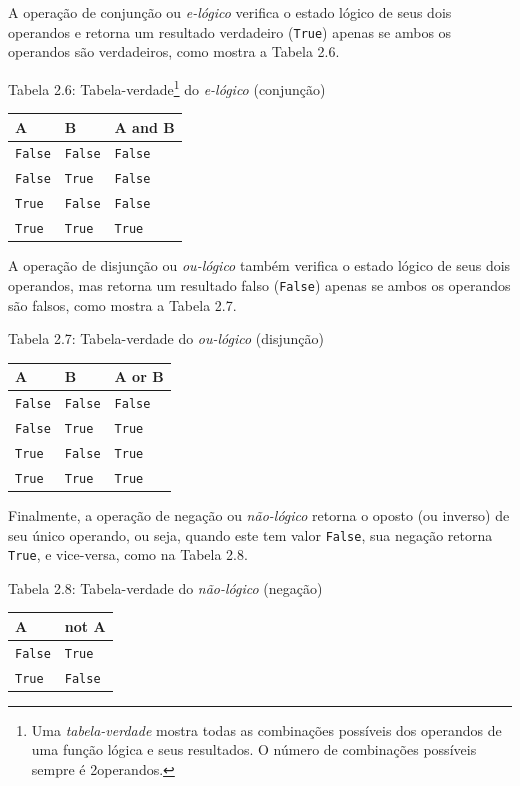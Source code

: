 \documentclass[
]{book}
\begin{document}
A operação de conjunção ou \emph{e-lógico} verifica o estado lógico de seus dois operandos e retorna um resultado verdadeiro (\texttt{True}) apenas se ambos os operandos são verdadeiros, como mostra a Tabela 2.6.

Tabela 2.6: Tabela-verdade\footnote{Uma \emph{tabela-verdade} mostra todas as combinações possíveis dos operandos de uma função lógica e seus resultados. O número de combinações possíveis sempre é 2operandos.} do \emph{e-lógico} (conjunção)

\begin{longtable}[]{@{}lll@{}}
\toprule
A & B & A and B \\
\midrule
\endhead
\texttt{False} & \texttt{False} & \texttt{False} \\
\texttt{False} & \texttt{True} & \texttt{False} \\
\texttt{True} & \texttt{False} & \texttt{False} \\
\texttt{True} & \texttt{True} & \texttt{True} \\
\bottomrule
\end{longtable}

A operação de disjunção ou \emph{ou-lógico} também verifica o estado lógico de seus dois operandos, mas retorna um resultado falso (\texttt{False}) apenas se ambos os operandos são falsos, como mostra a Tabela 2.7.

Tabela 2.7: Tabela-verdade do \emph{ou-lógico} (disjunção)

\begin{longtable}[]{@{}lll@{}}
\toprule
A & B & A or B \\
\midrule
\endhead
\texttt{False} & \texttt{False} & \texttt{False} \\
\texttt{False} & \texttt{True} & \texttt{True} \\
\texttt{True} & \texttt{False} & \texttt{True} \\
\texttt{True} & \texttt{True} & \texttt{True} \\
\bottomrule
\end{longtable}

Finalmente, a operação de negação ou \emph{não-lógico} retorna o oposto (ou inverso) de seu único operando, ou seja, quando este tem valor \texttt{False}, sua negação retorna \texttt{True}, e vice-versa, como na Tabela 2.8.

Tabela 2.8: Tabela-verdade do \emph{não-lógico} (negação)

\begin{longtable}[]{@{}ll@{}}
\toprule
A & not A \\
\midrule
\endhead
\texttt{False} & \texttt{True} \\
\texttt{True} & \texttt{False} \\
\bottomrule
\end{longtable}
\end{document}
